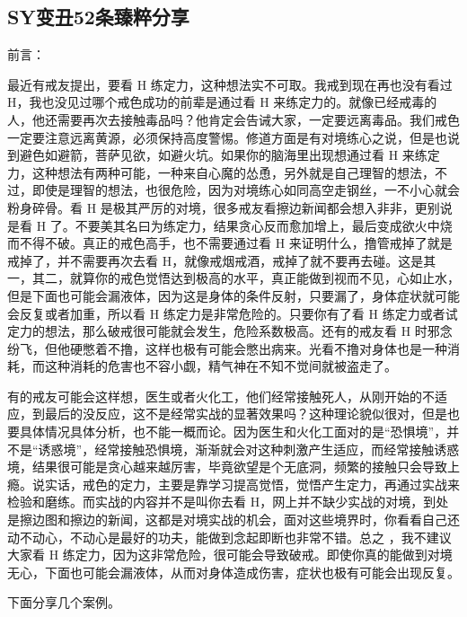 \subsection{SY变丑52条臻粹分享}

前言：

最近有戒友提出，要看 H 练定力，这种想法实不可取。我戒到现在再也没有看过 H，我也没见过哪个戒色成功的前辈是通过看 H 来练定力的。就像已经戒毒的人，他还需要再次去接触毒品吗？他肯定会告诫大家，一定要远离毒品。我们戒色一定要注意远离黄源，必须保持高度警惕。修道方面是有对境练心之说，但是也说到避色如避箭，菩萨见欲，如避火坑。如果你的脑海里出现想通过看 H 来练定力，这种想法有两种可能，一种来自心魔的怂恿，另外就是自己理智的想法，不过，即使是理智的想法，也很危险，因为对境练心如同高空走钢丝，一不小心就会粉身碎骨。看 H 是极其严厉的对境，很多戒友看擦边新闻都会想入非非，更别说是看 H 了。不要美其名曰为练定力，结果贪心反而愈加增上，最后变成欲火中烧而不得不破。真正的戒色高手，也不需要通过看 H 来证明什么，撸管戒掉了就是戒掉了，并不需要再次去看 H，就像戒烟戒酒，戒掉了就不要再去碰。这是其一，其二，就算你的戒色觉悟达到极高的水平，真正能做到视而不见，心如止水，但是下面也可能会漏液体，因为这是身体的条件反射，只要漏了，身体症状就可能会反复或者加重，所以看 H 练定力是非常危险的。只要你有了看 H 练定力或者试定力的想法，那么破戒很可能就会发生，危险系数极高。还有的戒友看 H 时邪念纷飞，但他硬憋着不撸，这样也极有可能会憋出病来。光看不撸对身体也是一种消耗，而这种消耗的危害也不容小觑，精气神在不知不觉间就被盗走了。

有的戒友可能会这样想，医生或者火化工，他们经常接触死人，从刚开始的不适应，到最后的没反应，这不是经常实战的显著效果吗？这种理论貌似很对，但是也要具体情况具体分析，也不能一概而论。因为医生和火化工面对的是“恐惧境”，并不是“诱惑境”，经常接触恐惧境，渐渐就会对这种刺激产生适应，而经常接触诱惑境，结果很可能是贪心越来越厉害，毕竟欲望是个无底洞，频繁的接触只会导致上瘾。说实话，戒色的定力，主要是靠学习提高觉悟，觉悟产生定力，再通过实战来检验和磨练。而实战的内容并不是叫你去看 H，网上并不缺少实战的对境，到处是擦边图和擦边的新闻，这都是对境实战的机会，面对这些境界时，你看看自己还动不动心，不动心是最好的功夫，能做到念起即断也非常不错。总之 ，我不建议大家看 H 练定力，因为这非常危险，很可能会导致破戒。即使你真的能做到对境无心，下面也可能会漏液体，从而对身体造成伤害，症状也极有可能会出现反复。

下面分享几个案例。

